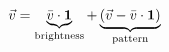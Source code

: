 \documentclass[preview]{standalone}
\begin{document}
\begin{align*}
\special{dvisvgm:raw <g id='unique000'>}\vec{v} = \underbrace{\bar{v} \cdot \mathbf{1}}_{\text{brightness}}+ \underbrace{(\vec{v} - \bar{v} \cdot \mathbf{1})}_{\text{pattern}}\special{dvisvgm:raw </g>}
\end{align*}
\end{document}
